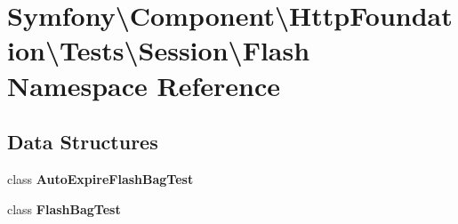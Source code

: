 \section{Symfony\textbackslash{}Component\textbackslash{}Http\+Foundation\textbackslash{}Tests\textbackslash{}Session\textbackslash{}Flash Namespace Reference}
\label{namespace_symfony_1_1_component_1_1_http_foundation_1_1_tests_1_1_session_1_1_flash}
\subsection*{Data Structures}
\begin{DoxyCompactItemize}
\item 
class {\bf Auto\+Expire\+Flash\+Bag\+Test}
\item 
class {\bf Flash\+Bag\+Test}
\end{DoxyCompactItemize}
